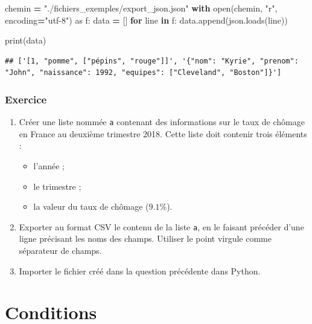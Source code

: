 \documentclass[
  12pt,
]{book}
\makeatletter
\newenvironment{Shaded}{\begin{snugshade}}{\end{snugshade}}
\newcommand{\BuiltInTok}[1]{#1}
\newcommand{\ControlFlowTok}[1]{\textcolor[rgb]{0.13,0.29,0.53}{\textbf{#1}}}
\newcommand{\ImportTok}[1]{#1}
\newcommand{\KeywordTok}[1]{\textcolor[rgb]{0.13,0.29,0.53}{\textbf{#1}}}
\newcommand{\NormalTok}[1]{#1}
\newcommand{\OperatorTok}[1]{\textcolor[rgb]{0.81,0.36,0.00}{\textbf{#1}}}
\newcommand{\StringTok}[1]{\textcolor[rgb]{0.31,0.60,0.02}{#1}}
\providecommand{\tightlist}{%
  \setlength{\itemsep}{0pt}\setlength{\parskip}{0pt}}
\numberwithin{equation}{section}
\numberwithin{countremarque}{section}
\newenvironment{exframe}{%
 \def\at@end@of@exframe{}%
 \ifinner\ifhmode%
  \def\at@end@of@exframe{\end{minipage}}%
  \begin{minipage}{\columnwidth}%
 \fi\fi%
 \def\FrameCommand##1{\hskip\@totalleftmargin \hskip-\fboxsep
 \colorbox{shadecolorex}{##1}\hskip-\fboxsep
     \hskip-\linewidth \hskip-\@totalleftmargin \hskip\columnwidth}%
 \MakeFramed {\advance\hsize-\width
   \@totalleftmargin\z@ \linewidth\hsize
   \@setminipage}}%
 {\par\unskip\endMakeFramed%
 \at@end@of@exframe}
\makeatother
\begin{document}
\begin{Shaded}
\begin{Highlighting}[]
\NormalTok{chemin }\OperatorTok{=} \StringTok{"./fichiers\_exemples/export\_json.json"}
\ControlFlowTok{with} \BuiltInTok{open}\NormalTok{(chemin, }\StringTok{"r"}\NormalTok{, encoding}\OperatorTok{=}\StringTok{"utf{-}8"}\NormalTok{) }\ImportTok{as}\NormalTok{ f:}
\NormalTok{    data }\OperatorTok{=}\NormalTok{ []}
    \ControlFlowTok{for}\NormalTok{ line }\KeywordTok{in}\NormalTok{ f:}
\NormalTok{        data.append(json.loads(line))}

\BuiltInTok{print}\NormalTok{(data)}
\end{Highlighting}
\end{Shaded}

\begin{lstlisting}
## ['[1, "pomme", ["pépins", "rouge"]]', '{"nom": "Kyrie", "prenom": "John", "naissance": 1992, "equipes": ["Cleveland", "Boston"]}']
\end{lstlisting}

\subsection{Exercice}\label{exercice-3}

\begin{exframe}
\begin{enumerate}
\def\labelenumi{\arabic{enumi}.}
\tightlist
\item
  Créer une liste nommée \texttt{a} contenant des informations sur le taux de chômage en France au deuxième trimestre 2018. Cette liste doit contenir trois éléments :

  \begin{itemize}
  \tightlist
  \item
    l'année ;
  \item
    le trimestre ;
  \item
    la valeur du taux de chômage (\(9.1\%\)).
  \end{itemize}
\item
  Exporter au format CSV le contenu de la liste \texttt{a}, en le faisant précéder d'une ligne précisant les noms des champs. Utiliser le point virgule comme séparateur de champs.
\item
  Importer le fichier créé dans la question précédente dans Python.
\end{enumerate}
\end{exframe}

\chapter{Conditions}\label{conditions}
\end{document}

